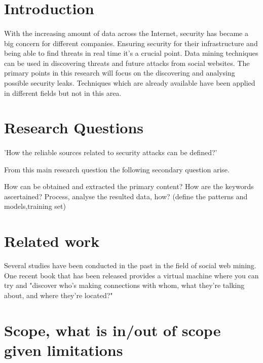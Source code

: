 \documentclass[12pt]{article}
\begin{document}
\tableofcontents

\newpage

\section*{Introduction}
\paragraph{}
With the increasing amount of data across the Internet, security has became a big concern for different companies. Ensuring security for their infrastructure and being able to find threats in real time it's a crucial point. Data mining techniques can be used in discovering threats and future attacks from social websites. The primary points in this research will focus on the discovering and analysing possible security leaks. Techniques which are already available have been applied in different fields but not in this area.

\section{Research Questions}
\paragraph{}

'How the reliable sources related to security attacks can be defined?'

From this main research question the following secondary question arise. 

How can be obtained and extracted the primary content?
How are the keywords ascertained?
Process, analyse the resulted data, how? (define the patterns and models,training set)


\section{Related work}

Several studies have been conducted in the past in the field of social web mining. One recent book that has been released provides a virtual machine where you can try and "discover who’s making connections with whom, what they’re talking about, and where they’re located?" \label{some:try}

\section*{Scope, what is in/out of scope given limitations}
\end{document}
